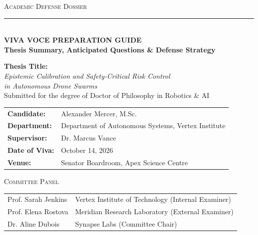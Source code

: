 \begin{titlepage}

\centering
\vspace*{1.5cm}
{\scshape\Large\color{SlateGrey} Academic Defense Dossier}\\[0.5cm]
{\color{Burgundy}\rule{4cm}{1.5pt}}\\[0.8cm]

{\Huge\bfseries\color{Burgundy} VIVA VOCE PREPARATION GUIDE}\\[0.4cm]
{\large\bfseries\color{SlateGrey} Thesis Summary, Anticipated Questions \& Defense Strategy}\\[1.5cm]

\begin{dossierbox}
  \centering
  \vspace{0.2cm}
  {\large\bfseries\sffamily\color{Burgundy} Thesis Title:}\\[0.2cm]
  {\Large\itshape\color{black} Epistemic Calibration and Safety-Critical Risk Control \\ in Autonomous Drone Swarms}\\[0.2cm]
  {\small\color{SlateGrey} Submitted for the degree of Doctor of Philosophy in Robotics \& AI}
  \vspace{0.2cm}
\end{dossierbox}

\vspace{1.5cm}

\begin{tabular}{ll}
  \textbf{\textcolor{Burgundy}{Candidate:}} & Alexander Mercer, M.Sc. \\
  \textbf{\textcolor{Burgundy}{Department:}} & Department of Autonomous Systems, Vertex Institute \\
  \textbf{\textcolor{Burgundy}{Supervisor:}} & Dr. Marcus Vance \\
  \textbf{\textcolor{Burgundy}{Date of Viva:}} & October 14, 2026 \\
  \textbf{\textcolor{Burgundy}{Venue:}} & Senator Boardroom, Apex Science Centre \\
\end{tabular}

\vspace{2cm}

{\scshape\color{SlateGrey} Committee Panel}\\[0.2cm]
\begin{tabular}{ll}
  Prof. Sarah Jenkins & Vertex Institute of Technology (Internal Examiner) \\
  Prof. Elena Rostova & Meridian Research Laboratory (External Examiner) \\
  Dr. Aline Dubois & Synapse Labs (Committee Chair) \\
\end{tabular}

\end{titlepage}